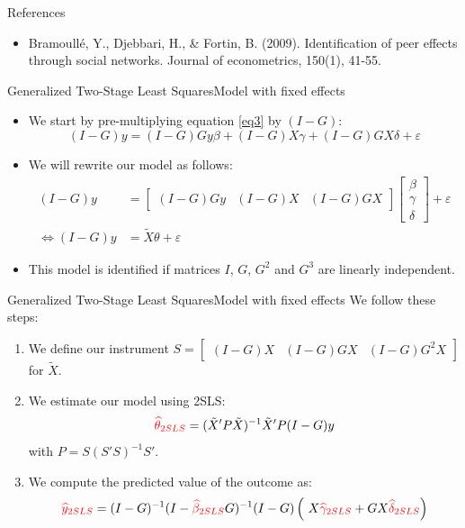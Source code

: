 \documentclass[aspectratio=169]{beamer}
\begin{document}
\appendix


\begin{frame}{References}
\begin{itemize}
\item Bramoullé, Y., Djebbari, H., \& Fortin, B. (2009). Identification of peer effects through social networks. Journal of econometrics, 150(1), 41-55.
\end{itemize}
\end{frame}

\begin{frame}{Generalized Two-Stage Least Squares}{Model with fixed effects} \label{fe_details}
\begin{itemize}
\item We start by pre-multiplying equation \eqref{eq3} by $(I-G)$:
$$(I-G) y = (I-G) {G} y \beta + (I-G) X \gamma  + (I-G) {G} X \delta + \varepsilon$$
\item We will rewrite our model as follows:
\begin{align*}
(I-G) y & = \begin{bmatrix} (I-G) Gy & (I-G) X & (I-G) GX \end{bmatrix} \begin{bmatrix} \beta \\ \gamma \\ \delta  \end{bmatrix} + \varepsilon \\
\Leftrightarrow (I-G) y & = \tilde{X} \theta + \varepsilon
\end{align*}
\item This model is identified if matrices $I$, $G$, $G^2$ and $G^3$ are linearly independent.
\end{itemize}
\end{frame}

\begin{frame}{Generalized Two-Stage Least Squares}{Model with fixed effects}
We follow these steps:
\begin{enumerate}
\item We define our instrument $ S = \begin{bmatrix} (I-G) X & (I-G) GX & (I-G) G^2X \end{bmatrix} $ for $\tilde{X}$.
\item We estimate our model using 2SLS: 
$$\textcolor{red}{\hat{\theta}_{2SLS}}= (\tilde{X}' P \tilde{X})^{-1} \tilde{X}' P (I-G) y  $$
with $P=S (S'S)^{-1} S'$.
\item We compute the predicted value of the outcome as:
$$ \textcolor{red}{\hat{y}_{2SLS}} = (I-G)^{-1}(I- \textcolor{red}{\hat{\beta}_{2SLS}} G)^{-1} (I-G) \left(\ X \textcolor{red}{\hat{\gamma}_{2SLS}}  +  G X \textcolor{red}{\hat{\delta}_{2SLS}}  \right) $$
\end{enumerate}
\end{frame}
\end{document}
